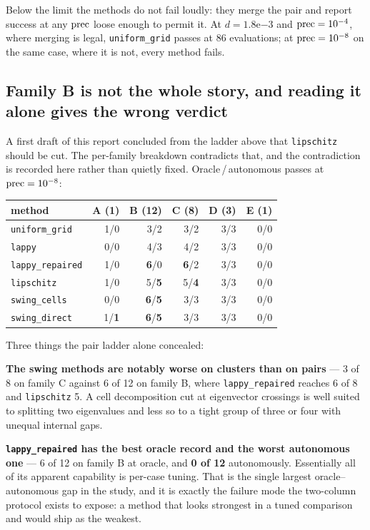 Below the limit the methods do not fail loudly: they merge the pair and report success at any
$\mathrm{prec}$ loose enough to permit it. At $d = 1.8\mathrm{e}{-3}$ and $\mathrm{prec} = 10^{-4}$, where merging
is legal, \texttt{uniform\_grid} passes at 86 evaluations; at $\mathrm{prec} = 10^{-8}$ on the same case,
where it is not, every method fails.

\subsection{Family B is not the whole story, and reading it alone gives the wrong verdict}

A first draft of this report concluded from the ladder above that \texttt{lipschitz} should be
cut. The per-family breakdown contradicts that, and the contradiction is recorded here rather
than quietly fixed. Oracle\,/\,autonomous passes at $\mathrm{prec} = 10^{-8}$:

\begin{center}
\begin{tabular}{lrrrrr}
\toprule
method & A (1) & B (12) & C (8) & D (3) & E (1) \\
\midrule
\texttt{uniform\_grid}   & 1/0 & 3/2 & 3/2 & 3/3 & 0/0 \\
\texttt{lappy}           & 0/0 & 4/3 & 4/2 & 3/3 & 0/0 \\
\texttt{lappy\_repaired} & 1/0 & \textbf{6}/0 & \textbf{6}/2 & 3/3 & 0/0 \\
\texttt{lipschitz}       & 1/0 & 5/\textbf{5} & 5/\textbf{4} & 3/3 & 0/0 \\
\texttt{swing\_cells}    & 0/0 & \textbf{6}/\textbf{5} & 3/3 & 3/3 & 0/0 \\
\texttt{swing\_direct}   & 1/\textbf{1} & \textbf{6}/\textbf{5} & 3/3 & 3/3 & 0/0 \\
\bottomrule
\end{tabular}
\end{center}

Three things the pair ladder alone concealed:

\textbf{The swing methods are notably worse on clusters than on pairs} --- 3 of 8 on family C
against 6 of 12 on family B, where \texttt{lappy\_repaired} reaches 6 of 8 and
\texttt{lipschitz} 5. A cell decomposition cut at eigenvector crossings is well suited to
splitting two eigenvalues and less so to a tight group of three or four with unequal internal
gaps.

\textbf{\texttt{lappy\_repaired} has the best oracle record and the worst autonomous one} ---
6 of 12 on family B at oracle, and \textbf{0 of 12} autonomously. Essentially all of its
apparent capability is per-case tuning. That is the single largest oracle--autonomous gap in
the study, and it is exactly the failure mode the two-column protocol exists to expose: a
method that looks strongest in a tuned comparison and would ship as the weakest.

